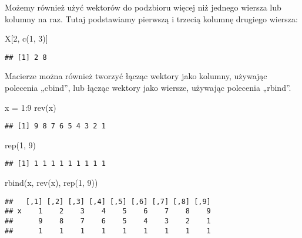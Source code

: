 \documentclass[
]{article}
\newenvironment{Shaded}{\begin{snugshade}}{\end{snugshade}}
\newcommand{\DecValTok}[1]{\textcolor[rgb]{0.00,0.00,0.81}{#1}}
\newcommand{\FunctionTok}[1]{\textcolor[rgb]{0.00,0.00,0.00}{#1}}
\newcommand{\NormalTok}[1]{#1}
\newcommand{\OtherTok}[1]{\textcolor[rgb]{0.56,0.35,0.01}{#1}}
\newcommand{\SpecialCharTok}[1]{\textcolor[rgb]{0.00,0.00,0.00}{#1}}
\begin{document}
Możemy również użyć wektorów do podzbioru więcej niż jednego wiersza lub
kolumny na raz. Tutaj podstawiamy pierwszą i trzecią kolumnę drugiego
wiersza:

\begin{Shaded}
\begin{Highlighting}[]
\NormalTok{X[}\DecValTok{2}\NormalTok{, }\FunctionTok{c}\NormalTok{(}\DecValTok{1}\NormalTok{, }\DecValTok{3}\NormalTok{)]}
\end{Highlighting}
\end{Shaded}

\begin{verbatim}
## [1] 2 8
\end{verbatim}

Macierze można również tworzyć łącząc wektory jako kolumny, używając
polecenia „cbind'', lub łącząc wektory jako wiersze, używając polecenia
„rbind''.

\begin{Shaded}
\begin{Highlighting}[]
\NormalTok{x }\OtherTok{=} \DecValTok{1}\SpecialCharTok{:}\DecValTok{9}
\FunctionTok{rev}\NormalTok{(x)}
\end{Highlighting}
\end{Shaded}

\begin{verbatim}
## [1] 9 8 7 6 5 4 3 2 1
\end{verbatim}

\begin{Shaded}
\begin{Highlighting}[]
\FunctionTok{rep}\NormalTok{(}\DecValTok{1}\NormalTok{, }\DecValTok{9}\NormalTok{)}
\end{Highlighting}
\end{Shaded}

\begin{verbatim}
## [1] 1 1 1 1 1 1 1 1 1
\end{verbatim}

\begin{Shaded}
\begin{Highlighting}[]
\FunctionTok{rbind}\NormalTok{(x, }\FunctionTok{rev}\NormalTok{(x), }\FunctionTok{rep}\NormalTok{(}\DecValTok{1}\NormalTok{, }\DecValTok{9}\NormalTok{))}
\end{Highlighting}
\end{Shaded}

\begin{verbatim}
##   [,1] [,2] [,3] [,4] [,5] [,6] [,7] [,8] [,9]
## x    1    2    3    4    5    6    7    8    9
##      9    8    7    6    5    4    3    2    1
##      1    1    1    1    1    1    1    1    1
\end{verbatim}
\end{document}
